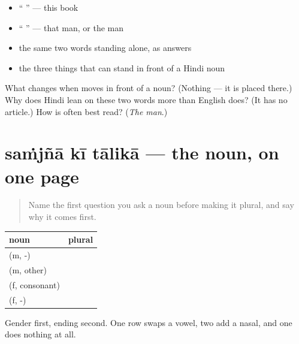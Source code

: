 \begin{itemize}
\raggedright
  \item \textquotedblleft{} \textquotedblright{} — this book
  \item \textquotedblleft{} \textquotedblright{} — that man, or the man
  \item the same two words standing alone, as answers
  \item the three things that can stand in front of a Hindi noun
\end{itemize}

\begin{tcolorbox}[breakable,colback=teal!4,colframe=teal!35!black,title={Before you move on}]
What changes when \textbf{} moves in front of a noun? (Nothing — it is placed there.) Why does Hindi lean on these two words more than English does? (It has no article.) How is \textbf{ } often best read? (\emph{The man}.)
\end{tcolorbox}
\section[\texorpdfstring{\hi{संज्ञा} \hi{की} \hi{तालिका} (saṁjñā kī tālikā)}{संज्ञा की तालिका (saṁjñā kī tālikā)}]{saṁjñā kī tālikā — the noun, on one page}

\label{lesson:HI-C91-repaso-sangya}



\begin{quote}
Name the first question you ask a noun before making it plural, and say why it comes first.
\end{quote}

\begin{grammarlens}[title={Grammar Lens: the four plurals}]
\noindent
\begin{tabularx}{\linewidth}{@{}>{\raggedright\arraybackslash}X>{\raggedright\arraybackslash}X@{}}
\toprule
\textbf{noun} & \textbf{plural} \\
\midrule
\hi{बच्चा} (m, -\hi{आ}) & \hi{बच्चे} \\
\hi{आदमी} (m, other) & \hi{आदमी} \\
\hi{किताब} (f, consonant) & \hi{किताबें} \\
\hi{भाषा} (f, -\hi{आ}) & \hi{भाषाएँ} \\
\bottomrule
\end{tabularx}

Gender first, ending second. One row swaps a vowel, two add a nasal, and one does nothing at all.
\end{grammarlens}

